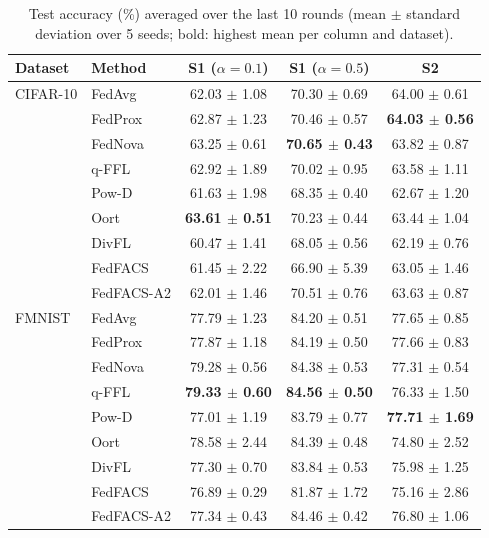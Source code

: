 \begin{table}[!htbp]
\centering\footnotesize\setlength{\tabcolsep}{3pt}\renewcommand{\arraystretch}{1.08}
\caption{Test accuracy (\%) averaged over the last 10 rounds (mean $\pm$ standard deviation over 5 seeds; bold: highest mean per column and dataset).}
\label{tab:main_last10}
\begin{tabular*}{\journalfloatwidth}{@{\extracolsep{\fill}}llccc@{}}
\toprule
Dataset & Method & S1 ($\alpha=0.1$) & S1 ($\alpha=0.5$) & S2 \\
\midrule
CIFAR-10 & FedAvg & 62.03 $\pm$ 1.08 & 70.30 $\pm$ 0.69 & 64.00 $\pm$ 0.61 \\
 & FedProx & 62.87 $\pm$ 1.23 & 70.46 $\pm$ 0.57 & \textbf{64.03 $\pm$ 0.56} \\
 & FedNova & 63.25 $\pm$ 0.61 & \textbf{70.65 $\pm$ 0.43} & 63.82 $\pm$ 0.87 \\
 & q-FFL & 62.92 $\pm$ 1.89 & 70.02 $\pm$ 0.95 & 63.58 $\pm$ 1.11 \\
 & Pow-D & 61.63 $\pm$ 1.98 & 68.35 $\pm$ 0.40 & 62.67 $\pm$ 1.20 \\
 & Oort & \textbf{63.61 $\pm$ 0.51} & 70.23 $\pm$ 0.44 & 63.44 $\pm$ 1.04 \\
 & DivFL & 60.47 $\pm$ 1.41 & 68.05 $\pm$ 0.56 & 62.19 $\pm$ 0.76 \\
 & FedFACS & 61.45 $\pm$ 2.22 & 66.90 $\pm$ 5.39 & 63.05 $\pm$ 1.46 \\
 & FedFACS-A2 & 62.01 $\pm$ 1.46 & 70.51 $\pm$ 0.76 & 63.63 $\pm$ 0.87 \\
\midrule
FMNIST & FedAvg & 77.79 $\pm$ 1.23 & 84.20 $\pm$ 0.51 & 77.65 $\pm$ 0.85 \\
 & FedProx & 77.87 $\pm$ 1.18 & 84.19 $\pm$ 0.50 & 77.66 $\pm$ 0.83 \\
 & FedNova & 79.28 $\pm$ 0.56 & 84.38 $\pm$ 0.53 & 77.31 $\pm$ 0.54 \\
 & q-FFL & \textbf{79.33 $\pm$ 0.60} & \textbf{84.56 $\pm$ 0.50} & 76.33 $\pm$ 1.50 \\
 & Pow-D & 77.01 $\pm$ 1.19 & 83.79 $\pm$ 0.77 & \textbf{77.71 $\pm$ 1.69} \\
 & Oort & 78.58 $\pm$ 2.44 & 84.39 $\pm$ 0.48 & 74.80 $\pm$ 2.52 \\
 & DivFL & 77.30 $\pm$ 0.70 & 83.84 $\pm$ 0.53 & 75.98 $\pm$ 1.25 \\
 & FedFACS & 76.89 $\pm$ 0.29 & 81.87 $\pm$ 1.72 & 75.16 $\pm$ 2.86 \\
 & FedFACS-A2 & 77.34 $\pm$ 0.43 & 84.46 $\pm$ 0.42 & 76.80 $\pm$ 1.06 \\

\end{tabular*}
\end{table}
